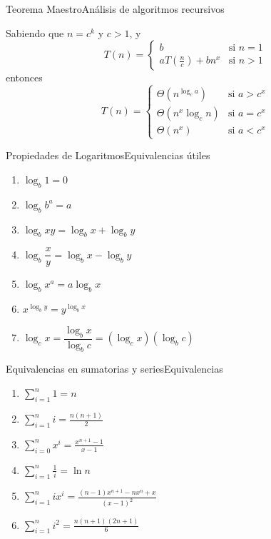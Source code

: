 \documentclass[spanish, c]{beamer}
\begin{document}
\begin{frame}{Teorema Maestro}{Análisis de algoritmos recursivos}
    \begin{theorem}
        Sabiendo que $n = c^k$ y $c > 1$, y 
        $$T(n) =
        \begin{cases}
            b & \text{si } n = 1 \\
            aT\left( \frac{n}{c} \right) + bn^x & \text{si } n > 1
        \end{cases}$$
        entonces
        $$T(n) =
        \begin{cases}
            \Theta (n^{\log_c a}) & \text{si } a > c^x \\
            \Theta (n^x \log_c n) & \text{si } a = c^x \\
            \Theta (n^x) & \text{si } a < c^x
        \end{cases} $$
    \end{theorem}
\end{frame}

\begin{frame}{Propiedades de Logaritmos}{Equivalencias útiles}
    \begin{enumerate}
        \itemsep2.5ex
        \item $\log_b 1 = 0$
        \item $\log_b b^a = a$
        \item $\log_b xy = \log_b x + \log_b y$
        \item $\log_b \dfrac{x}{y} = \log_b x - \log_b y$
        \item $\log_b x^a = a \log_b x$
        \item $x^{\log_b y} = y^{\log_b x}$
        \item $\log_c x = \dfrac{\log_b x}{\log_b c} = (\log_c x)(\log_b c)$
    \end{enumerate}
\end{frame}

\begin{frame}{Equivalencias en sumatorias y series}{Equivalencias}
    \begin{enumerate}
        \item $\displaystyle \sum_{i = 1}^n 1 = n$
        \item $\displaystyle \sum_{i = 1}^n i = \frac{n(n+1)}{2}$
        \item $\displaystyle \sum_{i=0}^n x^i = \frac{x^{n+1} - 1}{x - 1}$
        \item $\displaystyle \sum_{i=1}^n \frac{1}{i} = \ln n$
        \item $\displaystyle \sum_{i=1}^n ix^i = \frac{(n-1)x^{n+1} - nx^n + x}{(x-1)^2}$
        \item $\displaystyle \sum_{i=1}^n i^2 = \frac{n(n+1)(2n + 1)}{6}$
    \end{enumerate}

\end{frame}



\end{document}
